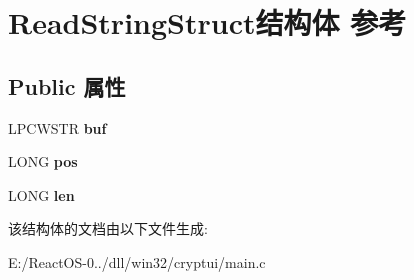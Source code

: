 \hypertarget{struct_read_string_struct}{}\section{Read\+String\+Struct结构体 参考}
\label{struct_read_string_struct}
\subsection*{Public 属性}
\begin{DoxyCompactItemize}
\item 
\mbox{\label{struct_read_string_struct_a93692fea3fe0f8cdba4d34aeb2b5655e}} 
L\+P\+C\+W\+S\+TR {\bfseries buf}
\item 
\mbox{\label{struct_read_string_struct_adc32e5393d6c0a3909647c0d5bd2e2fc}} 
L\+O\+NG {\bfseries pos}
\item 
\mbox{\label{struct_read_string_struct_a2c6ea5357649db098e279b2747d8374a}} 
L\+O\+NG {\bfseries len}
\end{DoxyCompactItemize}


该结构体的文档由以下文件生成\+:\begin{DoxyCompactItemize}
\item 
E\+:/\+React\+O\+S-\/0../dll/win32/cryptui/main.\+c\end{DoxyCompactItemize}
